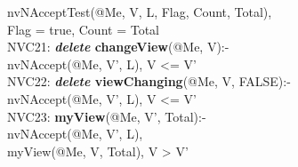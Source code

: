 \begin{code}
\> nvNAcceptTest(@Me, V, L, Flag, Count, Total), \\
\> Flag = true, Count = Total\\
NVC21: \textbf{\textit{delete} changeView}(@Me, V):-\\
\> nvNAccept(@Me, V', L), V <= V'\\
NVC22: \textbf{\textit{delete} viewChanging}(@Me, V, FALSE):-\\
\> nvNAccept(@Me, V', L), V <= V'\\
NVC23: \textbf{myView}(@Me, V', Total):-\\
\> nvNAccept(@Me, V', L),\\
\> myView(@Me, V, Total), V > V'\\
\end{code}
